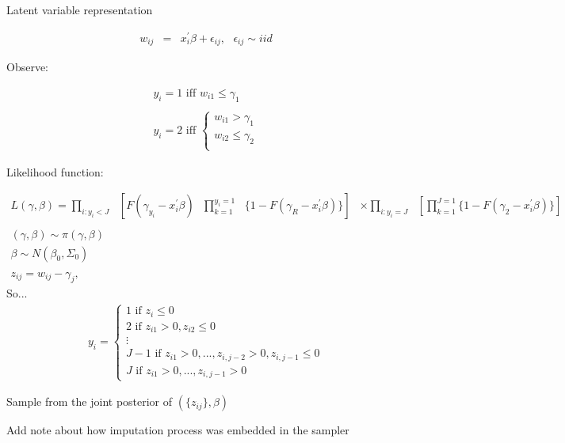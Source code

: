 Latent variable representation

\begin{eqnarray}
	w_{ij} &=& x_{i}^{'}\beta+\epsilon_{ij},\text{ }\epsilon_{ij} \sim iid \nonumber
\end{eqnarray}

Observe:

\begin{eqnarray}
	y_{i} = 1\text{ iff } w_{i1} \leq \gamma_{1} \nonumber \\
	\nonumber \\
	y_{i} = 2\text{ iff }
	\begin{cases}
	w_{i1} > \gamma_{1} \nonumber \\
	w_{i2} \leq \gamma_{2} \nonumber \\
\end{cases}
\end{eqnarray}

Likelihood function:

\begin{eqnarray}
	L(\gamma,\beta) = \prod_{i\colon y_{i}<J}\text{ }[ F(\gamma_{y_{i}} - x_{i}^{'}\beta)\text{ }\prod_{k=1}^{y_{i}=1}\text{ }\{1-F(\gamma_{R}-x_{i}^{'}\beta)\}] &\times \displaystyle \prod_{i\colon y_{i}=J}\text{ }[\prod_{k=1}^{J=1} \{1-F(\gamma_{2} - x_{i}^{'}\beta)\}] \nonumber \\
	\nonumber \\
	(\gamma,\beta) \sim \pi (\gamma,\beta) & \nonumber \\
	\beta \sim N(\beta_{0},\Sigma_{0}) & \nonumber \\
	\nonumber \\
	z_{ij} = w_{ij} - \gamma_{j}, & \nonumber
	\end{eqnarray}
	So...
	\begin{eqnarray}
	y_{i} =
	\begin{cases}
	1\text{ if }z_{i} \leq 0 \nonumber \\
	2\text{ if }z_{i1} > 0, z_{i2} \leq 0 \nonumber \\
	\vdots \nonumber \\
	J-1\text{ if }z_{i1} > 0,...,z_{i,j-2}>0,z_{i,j-1}\leq0 \nonumber \\
	J\text{ if }z_{i1}>0,...,z_{i,j-1}>0
\end{cases}
\end{eqnarray}

Sample from the joint posterior of $(\{z_{ij}\},\beta)$

Add note about how imputation process was embedded in the sampler

